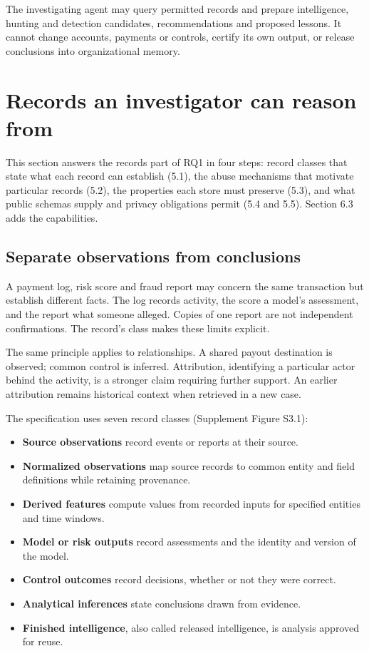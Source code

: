 \documentclass[acmlarge,review,anonymous,nonacm]{acmart}
\providecommand{\tightlist}{\setlength{\itemsep}{0pt}\setlength{\parskip}{0pt}}
\begin{document}
The investigating agent may query permitted records and prepare
intelligence, hunting and detection candidates, recommendations and
proposed lessons. It cannot change accounts, payments or controls,
certify its own output, or release conclusions into organizational
memory.

\hypertarget{records-an-investigator-can-reason-from}{%
\section{Records an investigator can reason
from}\label{records-an-investigator-can-reason-from}}

This section answers the records part of RQ1 in four steps: record
classes that state what each record can establish (5.1), the abuse
mechanisms that motivate particular records (5.2), the properties each
store must preserve (5.3), and what public schemas supply and privacy
obligations permit (5.4 and 5.5). Section 6.3 adds the capabilities.

\hypertarget{separate-observations-from-conclusions}{%
\subsection{Separate observations from
conclusions}\label{separate-observations-from-conclusions}}

A payment log, risk score and fraud report may concern the same
transaction but establish different facts. The log records activity, the
score a model's assessment, and the report what someone alleged. Copies
of one report are not independent confirmations. The record's class
makes these limits explicit.

The same principle applies to relationships. A shared payout destination
is observed; common control is inferred. Attribution, identifying a
particular actor behind the activity, is a stronger claim requiring
further support. An earlier attribution remains historical context when
retrieved in a new case.

The specification uses seven record classes (Supplement Figure S3.1):

\begin{itemize}
\tightlist
\item
  \textbf{Source observations} record events or reports at their source.
\item
  \textbf{Normalized observations} map source records to common entity
  and field definitions while retaining provenance.
\item
  \textbf{Derived features} compute values from recorded inputs for
  specified entities and time windows.
\item
  \textbf{Model or risk outputs} record assessments and the identity and
  version of the model.
\item
  \textbf{Control outcomes} record decisions, whether or not they were
  correct.
\item
  \textbf{Analytical inferences} state conclusions drawn from evidence.
\item
  \textbf{Finished intelligence}, also called released intelligence, is
  analysis approved for reuse.
\end{itemize}
\end{document}
